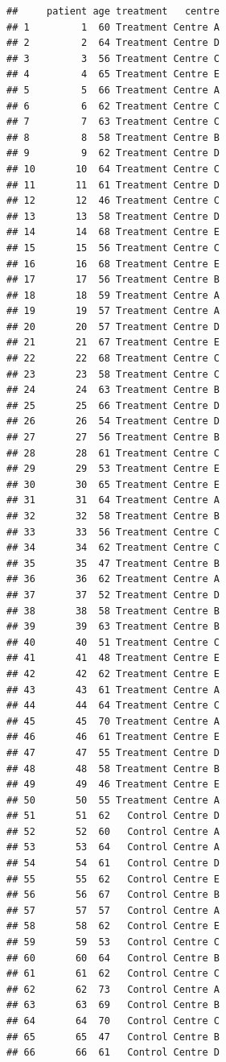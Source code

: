 \documentclass[]{article}
\begin{document}
\begin{verbatim}
##     patient age treatment   centre
## 1         1  60 Treatment Centre A
## 2         2  64 Treatment Centre D
## 3         3  56 Treatment Centre C
## 4         4  65 Treatment Centre E
## 5         5  66 Treatment Centre A
## 6         6  62 Treatment Centre C
## 7         7  63 Treatment Centre C
## 8         8  58 Treatment Centre B
## 9         9  62 Treatment Centre D
## 10       10  64 Treatment Centre C
## 11       11  61 Treatment Centre D
## 12       12  46 Treatment Centre C
## 13       13  58 Treatment Centre D
## 14       14  68 Treatment Centre E
## 15       15  56 Treatment Centre C
## 16       16  68 Treatment Centre E
## 17       17  56 Treatment Centre B
## 18       18  59 Treatment Centre A
## 19       19  57 Treatment Centre A
## 20       20  57 Treatment Centre D
## 21       21  67 Treatment Centre E
## 22       22  68 Treatment Centre C
## 23       23  58 Treatment Centre C
## 24       24  63 Treatment Centre B
## 25       25  66 Treatment Centre D
## 26       26  54 Treatment Centre D
## 27       27  56 Treatment Centre B
## 28       28  61 Treatment Centre C
## 29       29  53 Treatment Centre E
## 30       30  65 Treatment Centre E
## 31       31  64 Treatment Centre A
## 32       32  58 Treatment Centre B
## 33       33  56 Treatment Centre C
## 34       34  62 Treatment Centre C
## 35       35  47 Treatment Centre B
## 36       36  62 Treatment Centre A
## 37       37  52 Treatment Centre D
## 38       38  58 Treatment Centre B
## 39       39  63 Treatment Centre B
## 40       40  51 Treatment Centre C
## 41       41  48 Treatment Centre E
## 42       42  62 Treatment Centre E
## 43       43  61 Treatment Centre A
## 44       44  64 Treatment Centre C
## 45       45  70 Treatment Centre A
## 46       46  61 Treatment Centre E
## 47       47  55 Treatment Centre D
## 48       48  58 Treatment Centre B
## 49       49  46 Treatment Centre E
## 50       50  55 Treatment Centre A
## 51       51  62   Control Centre D
## 52       52  60   Control Centre A
## 53       53  64   Control Centre A
## 54       54  61   Control Centre D
## 55       55  62   Control Centre E
## 56       56  67   Control Centre B
## 57       57  57   Control Centre A
## 58       58  62   Control Centre E
## 59       59  53   Control Centre C
## 60       60  64   Control Centre B
## 61       61  62   Control Centre C
## 62       62  73   Control Centre A
## 63       63  69   Control Centre B
## 64       64  70   Control Centre C
## 65       65  47   Control Centre B
## 66       66  61   Control Centre D

\end{verbatim}
\end{document}
